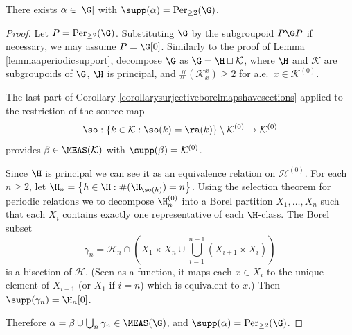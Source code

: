 \begin{lemma}
There exists $\alpha\in[\G]$ with $\supp(\alpha)=\operatorname{Per}_{\geq 2}(\G)$.
\end{lemma}
\begin{proof}
Let $P=\operatorname{Per}_{\geq 2}(\G)$. Substituting $\G$ by the subgroupoid $P\G P$ if necessary, we may assume $P=\G[0]$. Similarly to the proof of Lemma \ref{lemmaaperiodicsupport}, decompose $\G$ as $\G=\H\sqcup \mathcal{K}$, where $\H$ and $\mathcal{K}$ are subgroupoids of $\G$, $\H$ is principal, and $\#(\mathcal{K}^x_x)\geq 2$ for a.e.\ $x\in\mathcal{K}^{(0)}$.

The last part of Corollary \ref{corollarysurjectiveborelmapshavesections} applied to the restriction of the source map
\[\so:\left\{k\in\mathcal{K}:\so(k)=\ra(k)\right\}\setminus\mathcal{K}^{(0)}\to\mathcal{K}^{(0)}\]
provides $\beta\in\MEAS(\mathcal{K})$ with $\supp(\beta)=\mathcal{K}^{(0)}$.

Since $\H$ is principal we can see it as an equivalence relation on $\mathcal{H}^{(0)}$. For each $n\geq 2$, let $\H_n=\left\{h\in\H:\#(\H_{\so(h)})=n\right\}$. Using the selection theorem for periodic relations \cite[Theorem 12.16]{MR1321597} we to decompose $\H_n^{(0)}$ into a Borel partition $X_1,\ldots,X_n$ such that each $X_i$ contains exactly one representative of each $\H$-class. The Borel subset
\[\gamma_n=\mathcal{H}_n\cap\left(X_1\times X_n\cup \bigcup_{i=1}^{n-1}(X_{i+1}\times X_i)\right)\]
is a bisection of $\mathcal{H}$. (Seen as a function, it maps each $x\in X_i$ to the unique element of $X_{i+1}$ (or $X_1$ if $i=n$) which is equivalent to $x$.) Then $\supp(\gamma_n)=\H_n[0]$.

Therefore $\alpha=\beta\cup\bigcup_n\gamma_n\in\MEAS(\G)$, and $\supp(\alpha)=\operatorname{Per}_{\geq 2}(\G)$.\qedhere
\end{proof}

